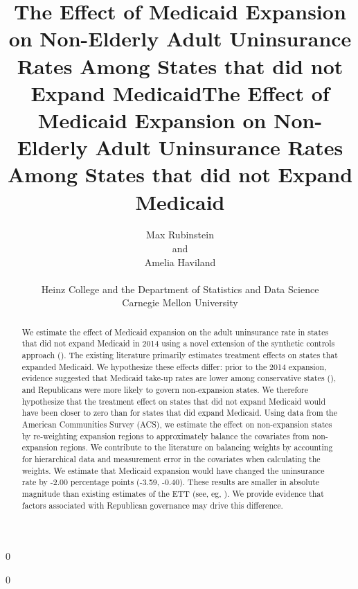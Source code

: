 \documentclass[12pt]{article}
\newcommand{\blind}{0}
\begin{document}
\blind
{
  \title{\bf The Effect of Medicaid Expansion on Non-Elderly Adult Uninsurance Rates Among States that did not Expand Medicaid}
  \author{Max Rubinstein \hspace{.2cm}\\
    and \\
    Amelia Haviland \\ \\
    Heinz College and the Department of Statistics and Data Science \\ Carnegie Mellon University}
  \maketitle
} \fi

\blind
{
  \bigskip
  \bigskip
  \bigskip
  \begin{center}
  \title{\bf The Effect of Medicaid Expansion on Non-Elderly Adult Uninsurance Rates Among States that did not Expand Medicaid}
\end{center}
  \medskip
} \fi

\bigskip

\begin{abstract}

We estimate the effect of Medicaid expansion on the adult uninsurance rate in states that did not expand Medicaid in 2014 using a novel extension of the synthetic controls approach (\cite{abadie2010synthetic}). The existing literature primarily estimates treatment effects on states that expanded Medicaid. We hypothesize these effects differ: prior to the 2014 expansion, evidence suggested that Medicaid take-up rates are lower among conservative states (\cite{sommers2012understanding}), and Republicans were more likely to govern non-expansion states. We therefore hypothesize that the treatment effect on states that did not expand Medicaid would have been closer to zero than for states that did expand Medicaid. Using data from the American Communities Survey (ACS), we estimate the effect on non-expansion states by re-weighting expansion regions to approximately balance the covariates from non-expansion regions. We contribute to the literature on balancing weights by accounting for hierarchical data and measurement error in the covariates when calculating the weights. We estimate that Medicaid expansion would have changed the uninsurance rate by -2.00 percentage points (-3.59, -0.40). These results are smaller in absolute magnitude than existing estimates of the ETT (see, eg, \cite{courtemanche2017early}). We provide evidence that factors associated with Republican governance may drive this difference.

\end{abstract}
\end{document}
